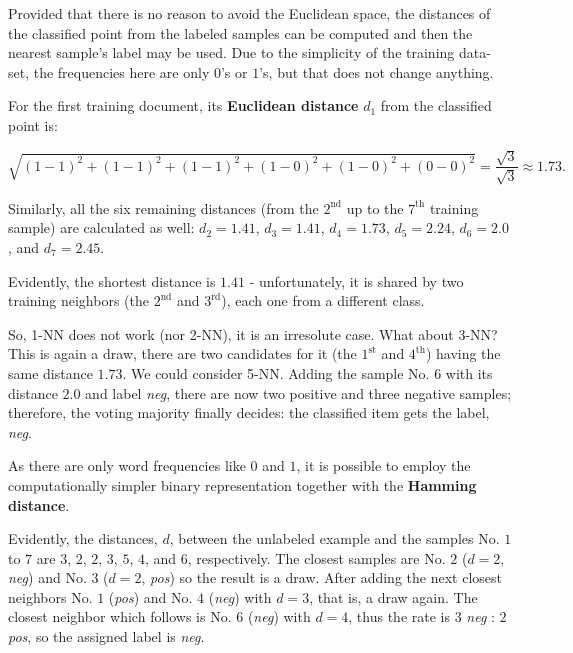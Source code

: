 \documentclass[11pt,openany,executivepaper]{book}
\begin{document}
Provided that there is no reason to avoid the Euclidean space, the distances of 
the classified point from the labeled samples can be computed and then the 
nearest sample's label may be used. Due to the simplicity of the training data-
set, the frequencies here are only $0$'s or $1$'s, but that does not change anything.

For the first training document, its \textbf{Euclidean distance} $d_1$ from the classified 
point is:

\begin{small}
\begin{equation*}
    \sqrt{(1-1)^2 + (1-1)^2 + (1-1)^2 + (1-0)^2 + (1-0)^2 + (0-0)^2} = \frac{\sqrt{3}}{\sqrt{3}} \approx 1.73.
\end{equation*}
\end{small}

Similarly, all the six remaining distances (from the $2^{\text{nd}}$ up to the $7^{\text{th}}$ training 
sample) are calculated as well: $d_2 = 1.41$, $d_3 = 1.41$, $d_4 = 1.73$, $d_5 = 2.24$, $d_6 = 
2.0$, and $d_7 = 2.45$.

Evidently, the shortest distance is $1.41$ - unfortunately, it is shared by two 
training neighbors (the $2^{\text{nd}}$ and $3^{\text{rd}}$), each one from a different class.

So, 1-NN does not work (nor 2-NN), it is an irresolute case. What about 
3-NN? This is again a draw, there are two candidates for it (the $1^{\text{st}}$ and $4^{\text{th}}$) 
having the same distance $1.73$. We could consider 5-NN. Adding the sample No. 
$6$ with its distance $2.0$ and label \textit{neg}, there are now two positive and three negative 
samples; therefore, the voting majority finally decides: the classified item gets the 
label, \textit{neg}.

As there are only word frequencies like $0$ and $1$, it is possible to employ 
the computationally simpler binary representation together with the \textbf{Hamming 
distance}.

Evidently, the distances, $d$, between the unlabeled example and the samples 
No. $1$ to $7$ are $3$, $2$, $2$, $3$, $5$, $4$, and $6$, respectively. The closest samples are No. $2$ 
($d=2$, \textit{neg}) and No. $3$ ($d=2$, \textit{pos}) so the result is a draw. After adding the next 
closest neighbors No. $1$ (\textit{pos}) and No. $4$ (\textit{neg}) with $d=3$, that is, a draw again. 
The closest neighbor which follows is No. $6$ (\textit{neg}) with $d=4$, thus the rate is $3$ 
\textit{neg} : $2$ \textit{pos}, so the assigned label is \textit{neg}.
\end{document}
